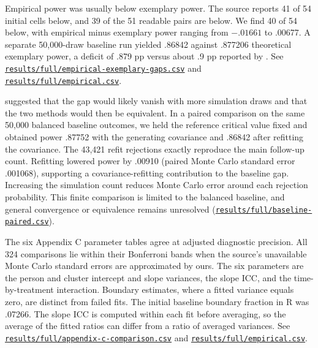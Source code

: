 Empirical power was usually below exemplary power. The source reports 41 of 54 initial cells below, and 39 of the 51 readable pairs are below. We find 40 of 54 below, with empirical minus exemplary power ranging from $-.01661$ to .00677. A separate 50,000-draw baseline run yielded .86842 against .877206 theoretical exemplary power, a deficit of .879 pp versus about .9 pp reported by \citet[pp.~106--107]{kupzyk2011}. See \href{https://github.com/alectionary/vibe-math/blob/master/formalization/kupzyk-power-assumptions/results/full/empirical-exemplary-gaps.csv}{\nolinkurl{results/full/empirical-exemplary-gaps.csv}} and \href{https://github.com/alectionary/vibe-math/blob/master/formalization/kupzyk-power-assumptions/results/full/empirical.csv}{\nolinkurl{results/full/empirical.csv}}.

\citet[pp.~106--107]{kupzyk2011} suggested that the gap would likely vanish with more simulation draws and that the two methods would then be equivalent. In a paired comparison on the same 50,000 balanced baseline outcomes, we held the reference critical value fixed and obtained power .87752 with the generating covariance and .86842 after refitting the covariance. The 43,421 refit rejections exactly reproduce the main follow-up count. Refitting lowered power by .00910 (paired Monte Carlo standard error .001068), supporting a covariance-refitting contribution to the baseline gap. Increasing the simulation count reduces Monte Carlo error around each rejection probability. This finite comparison is limited to the balanced baseline, and general convergence or equivalence remains unresolved (\href{https://github.com/alectionary/vibe-math/blob/master/formalization/kupzyk-power-assumptions/results/full/baseline-paired.csv}{\nolinkurl{results/full/baseline-paired.csv}}).
\label{dis:power-equivalence}

The six Appendix C parameter tables agree at adjusted diagnostic precision. All 324 comparisons lie within their Bonferroni bands when the source's unavailable Monte Carlo standard errors are approximated by ours. The six parameters are the person and cluster intercept and slope variances, the slope ICC, and the time-by-treatment interaction. Boundary estimates, where a fitted variance equals zero, are distinct from failed fits. The initial baseline boundary fraction in R was .07266. The slope ICC is computed within each fit before averaging, so the average of the fitted ratios can differ from a ratio of averaged variances. See \href{https://github.com/alectionary/vibe-math/blob/master/formalization/kupzyk-power-assumptions/results/full/appendix-c-comparison.csv}{\nolinkurl{results/full/appendix-c-comparison.csv}} and \href{https://github.com/alectionary/vibe-math/blob/master/formalization/kupzyk-power-assumptions/results/full/empirical.csv}{\nolinkurl{results/full/empirical.csv}}.

